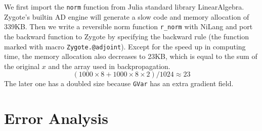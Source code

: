 \documentclass{article}
\newcommand{\<}{\langle}
\renewcommand{\>}{\rangle}
\theoremstyle{definition}\newtheorem{definition}{\textit{Definition}}
\begin{document}
We first import the \texttt{norm} function from Julia standard library LinearAlgebra.
Zygote's builtin AD engine will generate a slow code and memory allocation of 339KB.
Then we write a reversible norm function \texttt{r\_norm} with NiLang and port the backward function to Zygote by specifying the backward rule (the function marked with macro \texttt{Zygote.@adjoint}).
Except for the speed up in computing time, the memory allocation also decreases to 23KB, which is equal to the sum of the original $x$ and the array used in backpropagation.
$$(1000\times 8 + 1000\times 8\times 2)/1024 \approx 23$$
The later one has a doubled size because \texttt{GVar} has an extra gradient field.

\section{Error Analysis}

\end{document}
